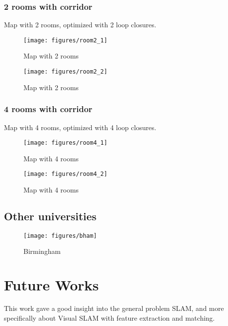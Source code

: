 \clearpage

\subsection{2 rooms with corridor}
Map with 2 rooms, optimized with 2 loop closures.

\begin{figure}[h!]
\centering
\texttt{[image: figures/room2\_1]}
\caption{Map with 2 rooms}
\end{figure}

\begin{figure}[h!]
\centering
\texttt{[image: figures/room2\_2]}
\caption{Map with 2 rooms}
\end{figure}

\clearpage

\subsection{4 rooms with corridor}
Map with 4 rooms, optimized with 4 loop closures.

\begin{figure}[h!]
\centering
\texttt{[image: figures/room4\_1]}
\caption{Map with 4 rooms}
\end{figure}

\begin{figure}[h!]
\centering
\texttt{[image: figures/room4\_2]}
\caption{Map with 4 rooms}
\end{figure}

\clearpage

\section{Other universities}

\begin{figure}[h]
\centering
\texttt{[image: figures/bham]}
\caption{Birmingham}
\end{figure}

\chapter{Future Works}

This work gave a good insight into the general problem SLAM, and more specifically about Visual SLAM with feature extraction and matching.

